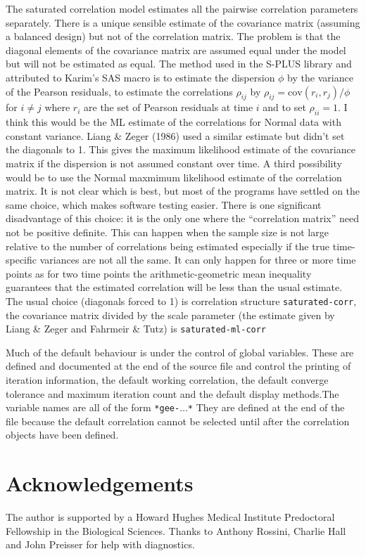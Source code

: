 \documentclass[10pt]{article}
\begin{document}
The saturated correlation model estimates all the pairwise correlation parameters separately. There is a unique sensible estimate of the covariance matrix (assuming a balanced design) but not of the correlation matrix.  The problem is that the diagonal elements of the covariance matrix are assumed equal under the model but will not be estimated as equal.  The method used in the S-PLUS library and attributed to Karim's SAS macro is to estimate the dispersion $\phi$ by the variance of the Pearson residuals, to estimate the correlations $\rho_{ij}$ by
$\rho_{ij}=\textrm{cov}(r_{i},r_{j})/\phi$ for $i\neq j$ where $r_i$ are the set of Pearson residuals at time $i$ and to set $\rho_{ii}=1$.  I think this would be the ML estimate of the correlations for Normal data with constant variance. Liang \& Zeger (1986) used a similar estimate but didn't set the diagonals to 1. This gives the maximum likelihood estimate of the covariance matrix if the dispersion is not assumed constant over time. A third possibility would be to use the Normal maxmimum likelihood estimate of the correlation matrix. It is not clear which is best, but most of the programs  have settled on the same choice, which makes software testing easier. There is one significant disadvantage of this choice: it is the only one where the ``correlation matrix'' need not be positive definite.  This can happen when the sample size is not large relative to the number of correlations being estimated especially if the true time-specific variances are not all the same. It can only happen for three or more time points as for two time points the arithmetic-geometric mean inequality guarantees that the estimated correlation will be less than the usual estimate. The usual choice (diagonals forced to 1) is correlation structure \texttt{saturated-corr}, the covariance matrix divided by the scale parameter (the estimate given by Liang \& Zeger and Fahrmeir \& Tutz) is \texttt{saturated-ml-corr}


Much of the default behaviour is under the control of global variables. These are defined and documented at the end of the source file and control the printing of iteration information, the default working correlation, the default converge tolerance and maximum iteration count and the default display methods.The variable names are all of the form \texttt{*gee-$\ldots$*} They are defined at the end of the file because the default correlation cannot be selected until after the correlation objects have been defined.


\section{Acknowledgements}
The author is  supported by a Howard Hughes Medical Institute Predoctoral Fellowship in the Biological Sciences.  Thanks to Anthony Rossini, Charlie Hall and John Preisser for help with diagnostics.
\end{document}
